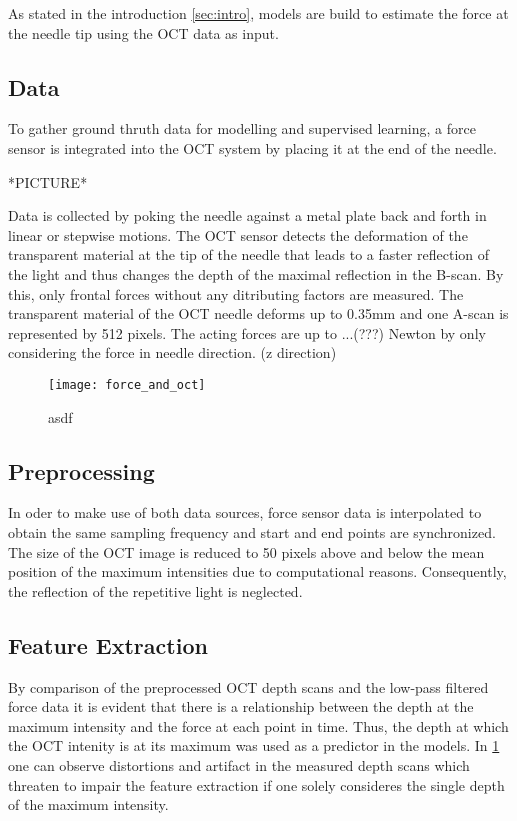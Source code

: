 

As stated in the introduction \ref{sec:intro}, models are build to estimate the force at the needle tip 
using the OCT data as input.

\subsection{Data}
To gather ground thruth data for modelling and supervised learning, a force sensor is 
integrated into the OCT system by placing it at the end of the needle.

*PICTURE*

Data is collected by poking the needle against a metal plate back and forth in linear or stepwise motions.
The OCT sensor detects the deformation of the transparent material at the tip of the needle that leads to a faster reflection of the light and thus
changes the depth of the maximal reflection in the B-scan.
By this, only frontal forces without any ditributing factors are measured.
The transparent material of the OCT needle deforms up to 0.35mm and one A-scan is represented by 512 pixels.
The acting forces are up to ...(???) Newton by only considering the force in needle direction. (z direction)

\begin{figure}
    \centering
    \texttt{[image: force\_and\_oct]}
    \caption{asdf}
    \label{fig:force_and_oct}
\end{figure}

\subsection{Preprocessing}

In oder to make use of both data sources, force sensor data is interpolated to obtain the same sampling frequency and start
and end points are synchronized.
The size of the OCT image is reduced to 50 pixels above and below the mean position of the maximum intensities due to
computational reasons. Consequently, the reflection of the repetitive light is neglected.

\subsection{Feature Extraction}

By comparison of the preprocessed OCT depth scans and the low-pass filtered force data it is evident that there is a relationship between the depth at the maximum intensity and the force at each point in time.
Thus, the depth at which the OCT intenity is at its maximum was used as a predictor in the models.
In \cref{fig:force_and_oct} one can observe distortions and artifact in the measured depth scans which threaten to impair the feature extraction if one solely consideres the single depth of the maximum intensity.

